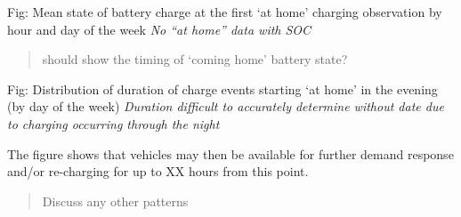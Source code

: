 \documentclass[]{article}
\begin{document}
Fig: Mean state of battery charge at the first `at home' charging
observation by hour and day of the week \emph{No ``at home'' data with
SOC}

\begin{quote}
should show the timing of `coming home' battery state?
\end{quote}

Fig: Distribution of duration of charge events starting `at home' in the
evening (by day of the week) \emph{Duration difficult to accurately
determine without date due to charging occurring through the night}

The figure shows that vehicles may then be available for further demand
response and/or re-charging for up to XX hours from this point.

\begin{quote}
Discuss any other patterns
\end{quote}
\end{document}
